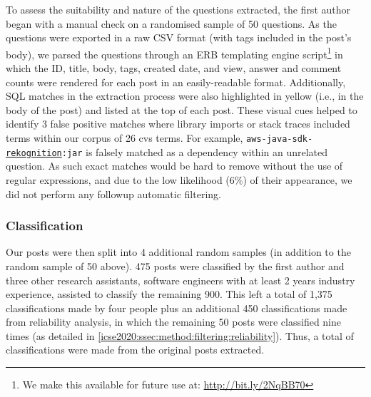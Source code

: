 To assess the suitability and nature of the \NumPostsFromSO{} questions extracted, the first author began with a manual check on a randomised sample of 50 questions. As the questions were exported in a raw CSV format (with  tags included in the post's body), we parsed the questions through an ERB templating engine script\footnote{We make this available for future use at: \url{http://bit.ly/2NqBB70}} in which the ID, title, body, tags, created date, and view, answer and comment counts were rendered for each post in an easily-readable format. %
Additionally, SQL matches in the extraction process were also highlighted in yellow (i.e., in the body of the post) and listed at the top of each post. These visual cues helped to identify 3 false positive matches where library imports or stack traces included terms within our corpus of 26 \gls{cvs} terms. For example, \texttt{aws-java-sdk-\uline{rekognition}:jar} is falsely matched as a dependency within an unrelated question. As such exact matches would be hard to remove without the use of regular expressions, and due to the low likelihood (6\%) of their appearance, we did not perform any followup automatic filtering.

\subsubsection{Classification}
\label{icse2020:ssec:method:filtering:classification}

Our \NumPostsFromSO{} posts were then split into 4 additional random samples (in addition to the random sample of 50 above). 475 posts were classified by the first author and three other research assistants, software engineers with at least 2 years industry experience, assisted to classify the remaining 900. This left a total of 1,375 classifications made by four people plus an additional 450 classifications made from reliability analysis, in which the remaining 50 posts were classified nine times (as detailed in \cref{icse2020:ssec:method:filtering:reliability}). Thus, a total of \NumPostsCategorised{} classifications were made from the original \NumPostsFromSO{} posts extracted.

